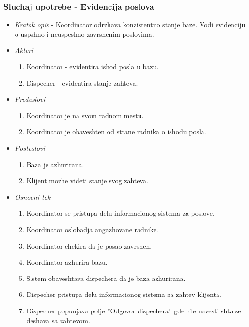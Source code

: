 \documentclass[10 pt]{article}
\begin{document}
	\subsubsection{Sluchaj upotrebe - Evidencija poslova}
	
		\begin{itemize}
			\item\textit{Kratak opis} - Koordinator odrzhava konzistentno stanje baze. Vodi evidenciju o uspshno i neuspeshno zavrshenim poslovima.
			
			\item\textit{Akteri}
				\begin{enumerate}
					\item Koordinator - evidentira is{h}od posla u bazu.
					\item Dispecher - evidentira stanje zahteva.
				\end{enumerate}
			
			\item\textit{Preduslovi}
				\begin{enumerate}
					\item Koordinator je na svom radnom mestu.
					\item Koordinator je obaveshten od strane radnika o is{h}odu posla.
				\end{enumerate}
		
			\item\textit{Postuslovi}
				\begin{enumerate}
					\item Baza je azhurirana. 
					\item Klijent mozhe videti stanje svog zahteva.
				\end{enumerate}
		
			\item\textit{Osnovni tok}
				\begin{enumerate}
					\item Koordinator se pristupa delu informacionog sistema za poslove.
					\item Koordinator oslobadja angazhovane radnike.
					\item Koordinator chekira da je posao zavrshen.
					\item Koordinator azhurira bazu.
					\item Sistem obaveshtava dispechera da je baza azhurirana.
					\item Dispecher pristupa delu informacionog sistema za zahtev klijenta.
					\item Dispecher popunjava polje ''Odgovor dispechera'' gde c1e navesti shta se deshava sa zahtevom.				
				\end{enumerate}
			

\end{itemize}
\end{document}
